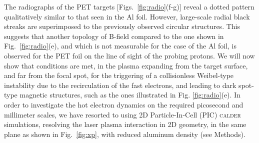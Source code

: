 \documentclass[aps,twocolumn,showpacs,superscriptaddress]{revtex4}
\begin{document}
The radiographs of the PET targets [Figs.~\ref{fig:radio}(f-g)] reveal a dotted pattern qualitatively similar to that seen in the Al foil. However, large-scale radial black streaks are superimposed to the previously observed circular structures. This suggests that another topology of B-field compared to the one shown in Fig.~\ref{fig:radio}(e), and which is not measurable for the case of the Al foil, is observed for the PET foil on the line of sight of the probing protons. 
We will now show that conditions are met, in the plasma  expanding from the target surface, and far from the focal spot, for the triggering of a collisionless Weibel-type instability due to the recirculation of the fast electrons, and leading to dark spot-type magnetic structures, such as the ones illustrated in Fig. \ref{fig:radio}(e). 
In order to investigate the hot electron dynamics on the required picosecond and millimeter scales, we have resorted to using 2D Particle-In-Cell (PIC) \textsc{calder} \cite{NF_Lefebvre_2003} simulations, resolving the laser plasma interaction in 2D geometry, in the same plane as shown in Fig.~\ref{fig:xp},  with reduced aluminum density (see Methods).
%
\end{document}
